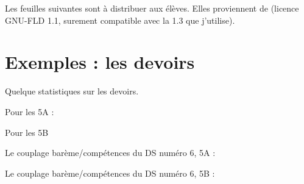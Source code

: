 


Les feuilles suivantes sont à distribuer aux élèves. Elles proviennent de \cite{NRHooXFvgpp5} (licence GNU-FLD 1.1, surement compatible avec la 1.3 que j'utilise).






\section{Exemples : les devoirs}

Quelque statistiques sur les devoirs.

\vfill

Pour les 5A :


\begin{center}
   
\end{center}

\vfill

Pour les 5B

\begin{center}
   
\end{center}


Le couplage barème/compétences du DS numéro 6, 5A :

\begin{center}
   
\end{center}

Le couplage barème/compétences du DS numéro 6, 5B :

\begin{center}
   
\end{center}
